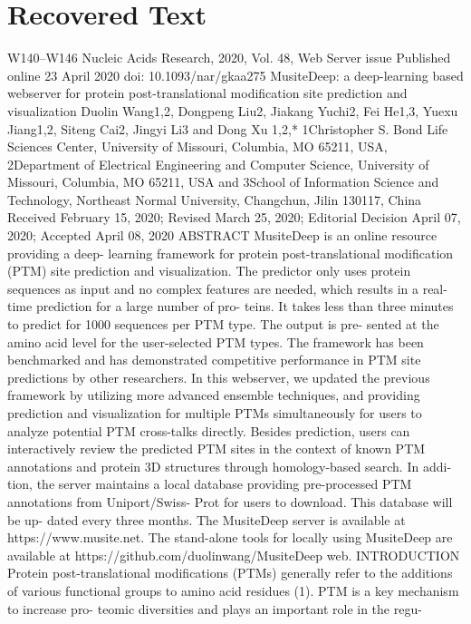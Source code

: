 \section{Recovered Text}
W140–W146
Nucleic Acids Research, 2020, Vol. 48, Web Server issue
Published online 23 April 2020
doi: 10.1093/nar/gkaa275
MusiteDeep: a deep-learning based webserver for
protein post-translational modiﬁcation site prediction
and visualization
Duolin Wang1,2, Dongpeng Liu2, Jiakang Yuchi2, Fei He1,3, Yuexu Jiang1,2, Siteng Cai2,
Jingyi Li3 and Dong Xu
1,2,*
1Christopher S. Bond Life Sciences Center, University of Missouri, Columbia, MO 65211, USA, 2Department of
Electrical Engineering and Computer Science, University of Missouri, Columbia, MO 65211, USA and 3School of
Information Science and Technology, Northeast Normal University, Changchun, Jilin 130117, China
Received February 15, 2020; Revised March 25, 2020; Editorial Decision April 07, 2020; Accepted April 08, 2020
ABSTRACT
MusiteDeep is an online resource providing a deep-
learning framework for protein post-translational
modiﬁcation (PTM) site prediction and visualization.
The predictor only uses protein sequences as input
and no complex features are needed, which results
in a real-time prediction for a large number of pro-
teins. It takes less than three minutes to predict for
1000 sequences per PTM type. The output is pre-
sented at the amino acid level for the user-selected
PTM types. The framework has been benchmarked
and has demonstrated competitive performance in
PTM site predictions by other researchers. In this
webserver, we updated the previous framework by
utilizing more advanced ensemble techniques, and
providing prediction and visualization for multiple
PTMs simultaneously for users to analyze potential
PTM cross-talks directly. Besides prediction, users
can interactively review the predicted PTM sites in
the context of known PTM annotations and protein 3D
structures through homology-based search. In addi-
tion, the server maintains a local database providing
pre-processed PTM annotations from Uniport/Swiss-
Prot for users to download. This database will be up-
dated every three months. The MusiteDeep server is
available at https://www.musite.net. The stand-alone
tools for locally using MusiteDeep are available at
https://github.com/duolinwang/MusiteDeep web.
INTRODUCTION
Protein post-translational modifications (PTMs) generally
refer to the additions of various functional groups to amino
acid residues (1). PTM is a key mechanism to increase pro-
teomic diversities and plays an important role in the regu-
